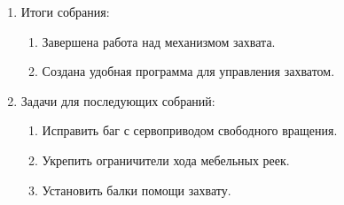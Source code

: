 \begin{enumerate}
\begin{enumerate}
    \end{enumerate}
    
	\item Итоги собрания: \newline
	\begin{enumerate}
	  \item Завершена работа над механизмом захвата.\newline
	  
      \item Создана удобная программа для управления захватом.\newline
      
    \end{enumerate}
    
	\item Задачи для последующих собраний:\newline
	\begin{enumerate}
	  \item Исправить баг с сервоприводом свободного вращения.\newline
	  
	  \item Укрепить ограничители хода мебельных реек.\newline
	  
	  \item Установить балки помощи захвату.\newline

    \end{enumerate}     
\end{enumerate}

\fillpage
